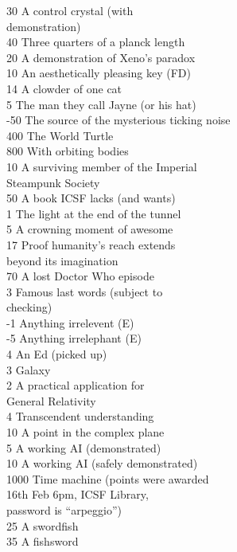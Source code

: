 \begin{multicols}{2}
\begin{tabbing}
30 	\> A control crystal (with \\ \> demonstration) \\
40 	\> Three quarters of a planck length \\
20 	\> A demonstration of Xeno's paradox \\
10  \> An aesthetically pleasing key (FD)\\
14 	\> A clowder of one cat \\
5   \> The man they call Jayne (or his hat) \\
-50 \> The source of the mysterious ticking noise \\
400	\> The World Turtle \\
800 \> With orbiting bodies \\
10  \> A surviving member of the Imperial \\ \> Steampunk Society \\
50	\> A book ICSF lacks (and wants) \\
1	\> The light at the end of the tunnel \\
5	\> A crowning moment of awesome \\
17	\> Proof humanity's reach extends \\ \> beyond its imagination \\
70  \> A lost Doctor Who episode \\
3	\> Famous last words (subject to \\ \> checking) \\
-1	\> Anything irrelevent (E) \\
-5  \> Anything irrelephant (E) \\
4	\> An Ed (picked up) \\
3	\> Galaxy \\
2	\> A practical application for \\ \> General Relativity \\
4	\> Transcendent understanding \\
10	\> A point in the complex plane \\
5   \> A working AI (demonstrated) \\
10  \> A working AI (safely demonstrated) \\
1000	\> Time machine (points were awarded \\ \> 16th Feb 6pm, ICSF Library, \\ \> password is ``arpeggio'') \\
25	\> A swordfish \\
35	\> A fishsword \\

\end{tabbing}
\end{multicols}
